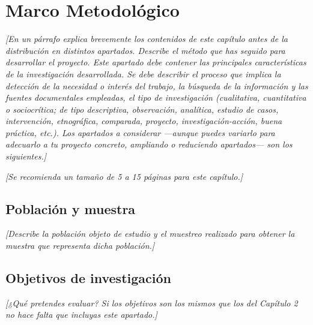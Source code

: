 
\chapter{Marco Metodológico}

\label{Chapter4}


\textit{[En un párrafo explica brevemente los contenidos de este capítulo antes de la distribución en distintos apartados. Describe el método que has seguido para desarrollar el proyecto. Este apartado debe contener las principales características de la investigación desarrollada. Se debe describir el proceso que implica la detección de la necesidad o interés del trabajo, la búsqueda de la información y las fuentes documentales empleadas, el tipo de investigación (cualitativa, cuantitativa o sociocrítica; de tipo descriptiva, observación, analítica, estudio de casos, intervención, etnográfica, comparada, proyecto, investigación-acción, buena práctica, etc.). Los apartados a considerar ---aunque puedes variarlo para adecuarlo a tu proyecto concreto, ampliando o reduciendo apartados--- son los siguientes.]}

\textit{[Se recomienda un tamaño de 5 a 15 páginas para este capítulo.]}


\section{Población y muestra}

\textit{[Describe la población objeto de estudio y el muestreo realizado para obtener la muestra que representa dicha población.]}


\section{Objetivos de investigación}

\textit{[¿Qué pretendes evaluar? Si los objetivos son los mismos que los del Capítulo 2 no hace falta que incluyas este apartado.]}


